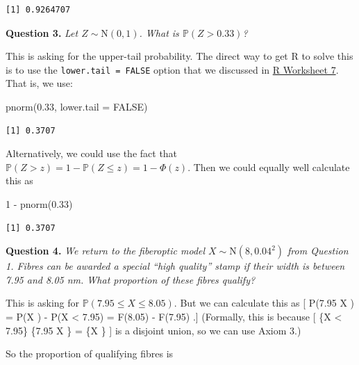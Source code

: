 \documentclass[
  letterpaper,
]{report}
\newenvironment{Shaded}{\begin{snugshade}}{\end{snugshade}}
\newcommand{\AttributeTok}[1]{\textcolor[rgb]{0.40,0.45,0.13}{#1}}
\newcommand{\ConstantTok}[1]{\textcolor[rgb]{0.56,0.35,0.01}{#1}}
\newcommand{\DecValTok}[1]{\textcolor[rgb]{0.68,0.00,0.00}{#1}}
\newcommand{\FloatTok}[1]{\textcolor[rgb]{0.68,0.00,0.00}{#1}}
\newcommand{\FunctionTok}[1]{\textcolor[rgb]{0.28,0.35,0.67}{#1}}
\newcommand{\NormalTok}[1]{\textcolor[rgb]{0.00,0.23,0.31}{#1}}
\newcommand{\SpecialCharTok}[1]{\textcolor[rgb]{0.37,0.37,0.37}{#1}}
\theoremstyle{definition}
\theoremstyle{definition}
\theoremstyle{remark}
\begin{document}
\begin{verbatim}
[1] 0.9264707
\end{verbatim}

\textbf{Question 3.} \emph{Let \(Z \sim \mathrm{N}(0,1)\). What is
\(\mathbb P(Z > 0.33)\)?}

This is asking for the upper-tail probability. The direct way to get R
to solve this is to use the \texttt{lower.tail\ =\ FALSE} option that we
discussed in \protect\hyperlink{r-work}{R Worksheet 7}. That is, we use:

\begin{Shaded}
\begin{Highlighting}[]
\FunctionTok{pnorm}\NormalTok{(}\FloatTok{0.33}\NormalTok{, }\AttributeTok{lower.tail =} \ConstantTok{FALSE}\NormalTok{)}
\end{Highlighting}
\end{Shaded}

\begin{verbatim}
[1] 0.3707
\end{verbatim}

Alternatively, we could use the fact that
\(\mathbb P(Z > z) = 1 - \mathbb P(Z \leq z) = 1 - \Phi(z)\). Then we
could equally well calculate this as

\begin{Shaded}
\begin{Highlighting}[]
\DecValTok{1} \SpecialCharTok{{-}} \FunctionTok{pnorm}\NormalTok{(}\FloatTok{0.33}\NormalTok{)}
\end{Highlighting}
\end{Shaded}

\begin{verbatim}
[1] 0.3707
\end{verbatim}

\textbf{Question 4.} \emph{We return to the fiberoptic model
\(X \sim \mathrm{N}(8, 0.04^2)\) from Question 1. Fibres can be awarded
a special ``high quality'' stamp if their width is between 7.95 and 8.05
nm. What proportion of these fibres qualify?}

This is asking for \(\mathbb P(7.95 \leq X \leq 8.05)\). But we can
calculate this as {[} \mathbb P(7.95 \leq X ) = \mathbb P(X
) - \mathbb P(X \textless{} 7.95) = F(8.05) - F(7.95) .{]}
(Formally, this is because {[} \{X \textless{} 7.95\} \cup \{7.95 \leq X
\} = \{X \} {]} is a disjoint union, so we can use
Axiom 3.)

So the proportion of qualifying fibres is
\end{document}
